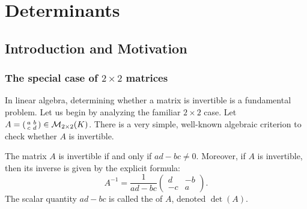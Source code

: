 \setcounter{chapter}{19} %
\chapter{Determinants}
\section{Introduction and Motivation}

\subsection{The special case of $2 \times 2$ matrices}
In linear algebra, determining whether a matrix is invertible is a fundamental problem. Let us begin by analyzing the familiar $2 \times 2$ case. Let $A = (\begin{smallmatrix} a & b \\ c & d \end{smallmatrix}) \in \mathcal{M}_{2 \times 2}(K)$. There is a very simple, well-known algebraic criterion to check whether $A$ is invertible.

\begin{proposition}\label{prop:inv_2x2}
  The matrix $A$ is invertible if and only if $ad - bc \neq 0$. Moreover, if $A$ is invertible, then its inverse is given by the explicit formula:
  \[
  A^{-1} = \frac{1}{ad - bc} \begin{pmatrix} d & -b \\ -c & a \end{pmatrix}.
  \]
  The scalar quantity $ad - bc$ is called the  of $A$, denoted $\det(A)$.
\end{proposition}

